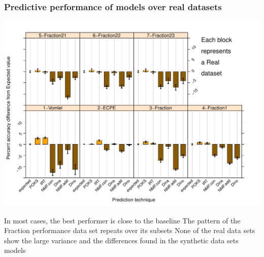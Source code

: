 \documentclass{beamer}
\begin{document}
\begin{frame}\frametitle{Predictive performance of models over real datasets}
\vspace{-0.5cm}
\includegraphics[scale =0.4] {images/Real}
\begin{overprint}
       In most cases, the best performer is close to the baseline %
       The pattern of the Fraction performance data set repeats over its subsets %
       None of the real data sets show the large variance and the differences found in the synthetic data sets models %
\end{overprint}
\end{frame}
\end{document}
